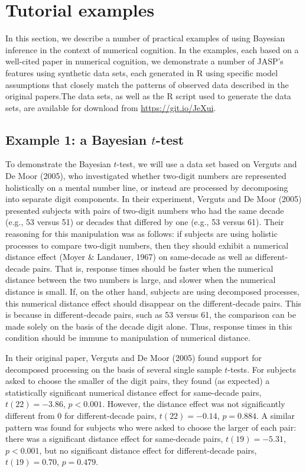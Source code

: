 \documentclass[english,,doc,floatsintext]{apa6}
\begin{document}
\hypertarget{tutorial-examples}{%
\section{Tutorial examples}\label{tutorial-examples}}

In this section, we describe a number of practical examples of using Bayesian inference in the context of numerical cognition. In the examples, each based on a well-cited paper in numerical cognition, we demonstrate a number of JASP's features using synthetic data sets, each generated in R using specific model assumptions that closely match the patterns of observed data described in the original papers.The data sets, as well as the R script used to generate the data sets, are available for download from \url{https://git.io/JeXui}.

\hypertarget{example-1-a-bayesian-t-test}{%
\subsection{\texorpdfstring{Example 1: a Bayesian \(t\)-test}{Example 1: a Bayesian t-test}}\label{example-1-a-bayesian-t-test}}

To demonstrate the Bayesian \(t\)-test, we will use a data set based on Verguts and De Moor (2005), who investigated whether two-digit numbers are represented holistically on a mental number line, or instead are processed by decomposing into separate digit components. In their experiment, Verguts and De Moor (2005) presented subjects with pairs of two-digit numbers who had the same decade (e.g., 53 versus 51) or decades that differed by one (e.g., 53 versus 61). Their reasoning for this manipulation was as follows: if subjects are using holistic processes to compare two-digit numbers, then they should exhibit a numerical distance effect (Moyer \& Landauer, 1967) on same-decade as well as different-decade pairs. That is, response times should be faster when the numerical distance between the two numbers is large, and slower when the numerical distance is small. If, on the other hand, subjects are using decomposed processes, this numerical distance effect should disappear on the different-decade pairs. This is because in different-decade pairs, such as 53 versus 61, the comparison can be made solely on the basis of the decade digit alone. Thus, response times in this condition should be immune to manipulation of numerical distance.

In their original paper, Verguts and De Moor (2005) found support for decomposed processing on the basis of several single sample \(t\)-tests. For subjects asked to choose the smaller of the digit pairs, they found (as expected) a statistically significant numerical distance effect for same-decade pairs, \(t(22) = -3.86\), \(p<0.001\). However, the distance effect was not significantly different from 0 for different-decade pairs, \(t(22)=-0.14\), \(p=0.884\). A similar pattern was found for subjects who were asked to choose the larger of each pair: there was a significant distance effect for same-decade pairs, \(t(19)=-5.31\), \(p<0.001\), but no significant distance effect for different-decade pairs, \(t(19)=0.70\), \(p=0.479\).
\end{document}
